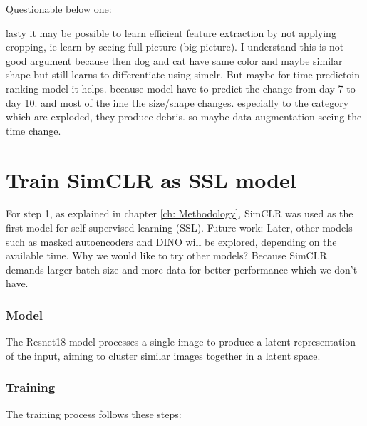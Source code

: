 Questionable below one:

lasty it may be possible to learn efficient feature extraction by not 
applying cropping, ie learn by seeing full picture (big picture). 
I understand this is not good argument because then dog and cat have same 
color and maybe similar shape but still learns to differentiate using simclr.
But maybe for time predictoin ranking model it helps. because model have to 
predict the change from day 7 to day 10. and most of the ime the size/shape
 changes. especially to the category which are exploded, they produce debris. 
 so maybe data augmentation seeing the time change. 





\section{Train SimCLR as SSL model}
For step 1, as explained in chapter \ref{ch: Methodology}, SimCLR was used as the first model for self-supervised learning (SSL). 
Future work: Later, other models such as masked autoencoders and DINO will be explored, depending on the available time.
Why we would like to try other models? Because SimCLR demands larger batch size and more data for better performance which we don't have.



\subsubsection{Model}
The Resnet18 \cite{he2015deepresiduallearningimage} model processes a single image to produce a latent representation of the input, aiming to cluster 
similar images together in a latent space. 

\subsubsection{Training }
The training process follows these steps:

